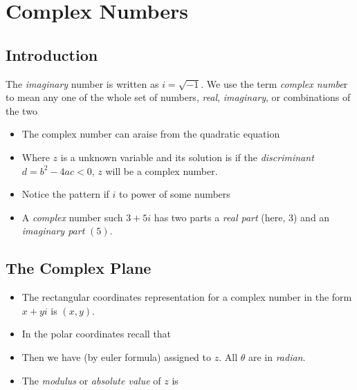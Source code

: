 \chapter{Complex Numbers} \label{ch:complex-numbers}
        \section{Introduction}
            The \textit{imaginary} number is written as $i=\sqrt{-1}$. We use the term \textit{complex numbe}r to 
            mean any one of the whole set of numbers, \textit{real}, \textit{imaginary}, or combinations of the two
            \begin{itemize}
                \item The complex number can araise from the quadratic equation 
                \item Where $z$ is a unknown variable and its solution is 
                if the \textit{discriminant} $d=b^2-4ac<0$, $z$ will be a complex number.
                \item Notice the pattern if $i$ to power of some numbers 
                \item A \textit{complex} number such $3+5i$ has two parts a \textit{real part} (here, $3$) 
                and an \textit{imaginary part} $(5)$.
            \end{itemize}
        \section{The Complex Plane}
            \begin{itemize}
                \item The rectangular coordinates representation for a complex number in the form 
                \colorbox{c1}{$x+yi$} is $(x, y)$.
                \item In the polar coordinates recall that 
                \item Then we have (by euler formula) assigned to $z$. All $\theta$ are in \textit{radian}.
                \item The \textit{modulus} or \textit{absolute value} of $z$ is
            \end{itemize}
